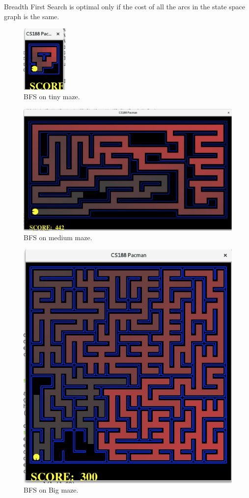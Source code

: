 \documentclass[
10pt, %
a4paper, %
oneside, %
headinclude,footinclude, %
BCOR5mm, %
]{scrartcl}
\begin{document}
\subsection*{}
Breadth First Search is optimal only if the cost of all the arcs in the state space graph is the same.




\begin{figure}[h!]
	\centering
	\includegraphics[width=0.20\textwidth]{images/fig_4_bfs_tinymaze.png}
	\caption{ BFS on tiny maze.}
	\label{fig:fig_4_bfs_tinymaze.png}
\end{figure}

\begin{figure}[h!]
	\centering
	\includegraphics[width=.6\textwidth]{images/fig_5_bfs_mediumMaze.png}
	\caption{ BFS on medium maze.}
	\label{fig:fig_5_bfs_mediumMaze}
\end{figure}


\begin{figure}[h!]
	\centering
	\includegraphics[width=.7\textwidth]{images/fig_6_bfs_bigmaze.png}
	\caption{ BFS on Big maze.}
	\label{fig:fig_6_bfs_bigmaze}
\end{figure}
\end{document}
